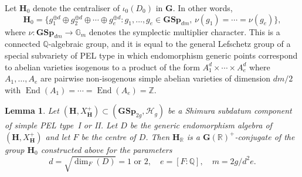 \documentclass[JEP,XML,SOM,Unicode,NoFloatCountersInSection]{cedram}
\newcommand{\bG}{\mathbb{G}}
\newcommand{\bQ}{\mathbb{Q}}
\newcommand{\bR}{\mathbb{R}}
\newcommand{\bZ}{\mathbb{Z}}
\newcommand{\Hg}{\mathcal{H}_g}
\newcommand{\gG}{\mathbf{G}}
\newcommand{\gGSp}{\mathbf{GSp}}
\newcommand{\gH}{\mathbf{H}}
\DeclareMathOperator{\End}{End}
\newtheorem{lemma}{Lemma}[section]
\begin{document}
Let $\gH_0$ denote the centraliser of $\iota_0(D_0)$ in $\gG$.
In other words,
\begin{equation} \label{eqn:H0}
\gH_0 = \{ g_1^{\oplus d} \oplus g_2^{\oplus d} \oplus \dotsb \oplus g_e^{\oplus d} :
g_1, \dotsc, g_e \in \gGSp_{dm},
\, \nu(g_1) = \dotsb = \nu(g_e) \},
\end{equation}
where $\nu \colon \gGSp_{dm} \to \bG_m$ denotes the symplectic multiplier character.
This is a connected $\bQ$-algebraic group, and it is equal to the general Lefschetz group of a special subvariety of PEL type in which endomorphism generic points correspond to abelian varieties isogenous to a product of the form $A_1^d \times \dotsb \times A_e^d$ where $A_1, \dotsc, A_e$ are pairwise non-isogenous simple abelian varieties of dimension $dm/2$ with $\End(A_1) = \dotsb = \End(A_e) = \bZ$.

\begin{lemma} \label{conj-class-mt}
Let $(\gH, X_\gH^+) \subset (\gGSp_{2g}, \Hg)$ be a Shimura subdatum component of simple PEL type~I or II.
Let $D$ be the generic endomorphism algebra of $(\gH, X_\gH^+)$ and let $F$ be the centre of $D$.
Then $\gH_\bR$ is a $\gG(\bR)^+$-conjugate of the group $\gH_0$ constructed above for the parameters
\[
d = \sqrt{\dim_F(D)} = 1 \text{ or } 2, \quad e = [F:\bQ], \quad m = 2g/d^2e.
\]
\end{lemma}
\end{document}

